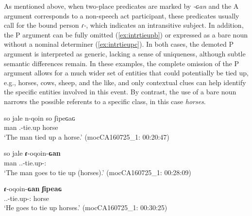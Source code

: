 \documentclass[12pt]{article}
\begin{document}
As mentioned above, when two‑place predicates are marked by \textit{-ɢan} and the A argument corresponds to a non-speech act participant, these predicates usually call for the bound person \textit{ɾ-}, which indicates an intransitive subject. In addition, the P argument can be fully omitted (\ref{ex:intrtieupb}) or expressed as a bare noun without a nominal determiner (\ref{ex:intrtieupc}).  In both cases, the demoted P argument is interpreted as generic, lacking a sense of uniqueness, although subtle semantic differences remain. In these examples, the complete omission of the P argument allows for a much wider set of entities that could  potentially be tied up, e.g., horses, cows, sheep, and the like, and only contextual clues can help identify the specific entities involved in this event. By contrast, the use of a bare noun narrows the possible referents to a specific class, in this case \textit{horses}.


\begin{exe}
\ex\label{ex:intrtieup}
\begin{xlist}
\ex 
	 \gll so jale n-qoin so ʃipeɢaɢ\\
			        {\DetTwo} man {\Third.\III}-tie.up {\DetTwo} horse\\
	\trans `The man tied up a horse.'
	 \hfill (mocCA160725\_1: 00:20:47) \label{ex:intrtieupa}

\ex 
	 \gll so jale \textbf{ɾ}-oqoin-\textbf{ɢan}  \\
 {\DetTwo} man {\Third.\II.\Intr}-tie.up-{\Vm:\Intr}\\
	  \trans `The man goes to tie up (horses).'
	  \hfill (mocCA160725\_1: 00:28:09) \label{ex:intrtieupb}

\ex 
	  \gll \textbf{ɾ}-oqoin-\textbf{ɢan} \textbf{ʃipeaɢ} \\
			  {\Third.\II.\Intr}-tie.up-{\Vm:\Intr}  horse   \\
	  \trans `He goes to tie up horses.'
	   \hfill (mocCA160725\_1: 00:30:25) 	\label{ex:intrtieupc}
	\end{xlist}
\end{exe}
\end{document}
